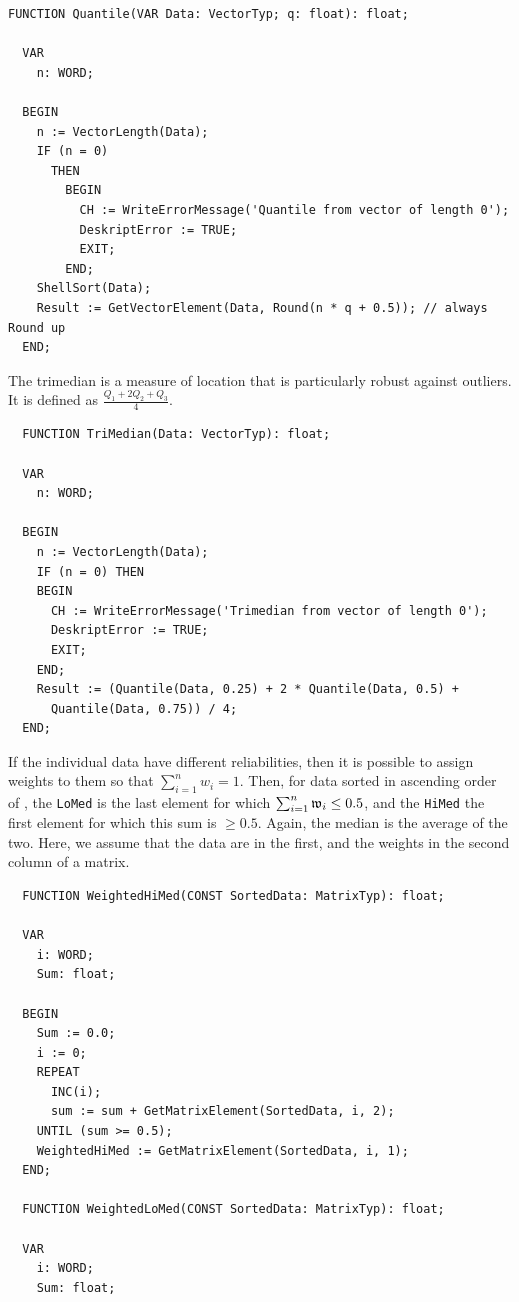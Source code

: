 \begin{refsection}
\begin{lstlisting}[caption=Quantiles of a data vector]
  FUNCTION Quantile(VAR Data: VectorTyp; q: float): float;

  VAR
    n: WORD;

  BEGIN
    n := VectorLength(Data);
    IF (n = 0)
      THEN
        BEGIN
          CH := WriteErrorMessage('Quantile from vector of length 0');
          DeskriptError := TRUE;
          EXIT;
        END;
    ShellSort(Data);
    Result := GetVectorElement(Data, Round(n * q + 0.5)); // always Round up
  END;
\end{lstlisting}

The trimedian is a measure of location that is particularly robust against outliers. It is defined as \(  \frac{Q_1 + 2 Q_2 + Q_3}{4} \).

\begin{lstlisting}
  FUNCTION TriMedian(Data: VectorTyp): float;

  VAR
    n: WORD;

  BEGIN
    n := VectorLength(Data);
    IF (n = 0) THEN
    BEGIN
      CH := WriteErrorMessage('Trimedian from vector of length 0');
      DeskriptError := TRUE;
      EXIT;
    END;
    Result := (Quantile(Data, 0.25) + 2 * Quantile(Data, 0.5) +
      Quantile(Data, 0.75)) / 4;
  END;
\end{lstlisting}

If the individual data have different reliabilities, then it is possible to assign weights to them so that \( \sum_{i=1}^n{w_i} = 1 \). Then, for data sorted in ascending order of ,  the \texttt{LoMed} is the last element for which \( \sum_{i=1}^n{\mathfrak{w}_i} \leq 0.5 \), and the \texttt{HiMed} the first element for which this sum is \( \geq 0.5 \). Again, the median is the average of the two. Here, we assume that the data are in the first, and the weights in the second column of a matrix.

\begin{lstlisting}
  FUNCTION WeightedHiMed(CONST SortedData: MatrixTyp): float;

  VAR
    i: WORD;
    Sum: float;

  BEGIN
    Sum := 0.0;
    i := 0;
    REPEAT
      INC(i);
      sum := sum + GetMatrixElement(SortedData, i, 2);
    UNTIL (sum >= 0.5);
    WeightedHiMed := GetMatrixElement(SortedData, i, 1);
  END;

  FUNCTION WeightedLoMed(CONST SortedData: MatrixTyp): float;

  VAR
    i: WORD;
    Sum: float;


\end{lstlisting}
\end{refsection}
